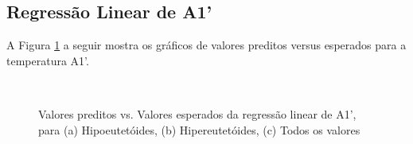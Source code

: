 \documentclass[brazil,tf,epusp]{usp}  %
\begin{document}
\subsection{Regressão Linear de A1'}

A Figura \ref{fig:LR_A1prime} a seguir mostra os gráficos de valores preditos versus esperados para a temperatura A1'.

\begin{figure}[!h]
\hfill
{}\\
\caption{Valores preditos vs. Valores esperados da regressão linear de A1', para (a) Hipoeutetóides, (b) Hipereutetóides, (c) Todos os valores}
\label{fig:LR_A1prime}
\end{figure}
\end{document}
